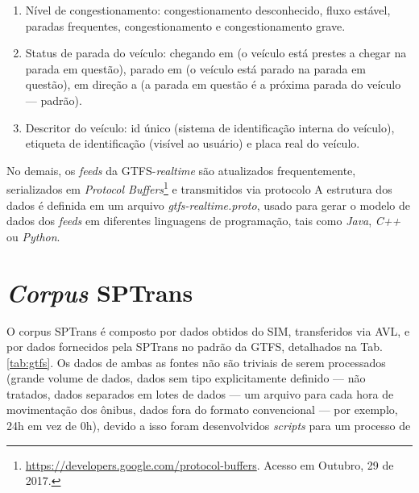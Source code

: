 \documentclass[
	12pt,				%
	oneside,			%
	a4paper,			%
	english,			%
	brazil				%
	]{abntex2ppgsi}
\begin{document}
{{\begin{enumerate}
\begin{enumerate}
\item Nível de congestionamento: congestionamento desconhecido, fluxo estável, paradas frequentes, congestionamento e congestionamento grave.
\item Status de parada do veículo: chegando em (o veículo está prestes a chegar na parada em questão), parado em (o veículo está parado na parada em questão), em direção a (a parada em questão é a próxima parada do veículo --- padrão). 
\item Descritor do veículo: id único (sistema de identificação interna do veículo), etiqueta de identificação (visível ao usuário) e placa real do veículo.
\end{enumerate}
\end{enumerate}

No demais, os \textit{feeds} da GTFS-\textit{realtime} são atualizados frequentemente, serializados em \textit{Protocol Buffers}\footnote{\url{https://developers.google.com/protocol-buffers}. Acesso em Outubro, 29 de 2017.} e transmitidos via protocolo  A estrutura dos dados é definida em um arquivo \textit{gtfs-realtime.proto}, usado para gerar o modelo de dados dos \textit{feeds} em diferentes linguagens de programação, tais como \textit{Java}, \textit{C++} ou \textit{Python}.


\section{\textit{Corpus} SPTrans}
\label{CorpusSPTrans}

O corpus SPTrans é composto por dados obtidos do SIM, transferidos via AVL, e por dados fornecidos pela SPTrans no padrão da GTFS, detalhados na Tab. \ref{tab:gtfs}. Os dados de ambas as fontes não são triviais de serem processados (grande volume de dados, dados sem tipo explicitamente definido --- não tratados, dados separados em lotes de dados --- um arquivo para cada hora de movimentação dos ônibus, dados fora do formato convencional --- por exemplo, 24h em vez de 0h), devido a isso foram desenvolvidos \textit{scripts} para um processo de  

}}
\end{document}
